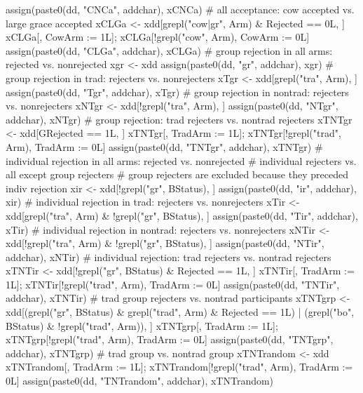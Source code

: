 \begin{Schunk}
\begin{Sinput}
{{    assign(paste0(dd, "CNCa", addchar), xCNCa)
    # all acceptance: cow accepted vs. large grace accepted
    xCLGa <- xdd[grepl("cow|gr", Arm) & Rejected == 0L, ]
    xCLGa[, CowArm := 1L]; xCLGa[!grepl("cow", Arm), CowArm := 0L]
    assign(paste0(dd, "CLGa", addchar), xCLGa)
    # group rejection in all arms: rejected vs. nonrejected
    xgr <- xdd
    assign(paste0(dd, "gr", addchar), xgr)
    # group rejection in trad: rejecters vs. nonrejecters
    xTgr <- xdd[grepl("tra", Arm), ]
    assign(paste0(dd, "Tgr", addchar), xTgr)
    # group rejection in nontrad: rejecters vs. nonrejecters
    xNTgr <- xdd[!grepl("tra", Arm), ]
    assign(paste0(dd, "NTgr", addchar), xNTgr)
    # group rejection: trad rejecters vs. nontrad rejecters
    xTNTgr <- xdd[GRejected == 1L, ]
    xTNTgr[, TradArm := 1L]; xTNTgr[!grepl("trad", Arm), TradArm := 0L]
    assign(paste0(dd, "TNTgr", addchar), xTNTgr)
    # individual rejection in all arms: rejected vs. nonrejected
    # individual rejecters vs. all except group rejecters
    # group rejecters are excluded because they preceded indiv rejection
    xir <- xdd[!grepl("gr", BStatus), ]
    assign(paste0(dd, "ir", addchar), xir)
    # individual rejection in trad: rejecters vs. nonrejecters
    xTir <- xdd[grepl("tra", Arm) & !grepl("gr", BStatus), ]
    assign(paste0(dd, "Tir", addchar), xTir)
    # individual rejection in nontrad: rejecters vs. nonrejecters
    xNTir <- xdd[!grepl("tra", Arm) & !grepl("gr", BStatus), ]
    assign(paste0(dd, "NTir", addchar), xNTir)
    # individual rejection: trad rejecters vs. nontrad rejecters
    xTNTir <- xdd[!grepl("gr", BStatus) & Rejected == 1L, ]
    xTNTir[, TradArm := 1L]; xTNTir[!grepl("trad", Arm), TradArm := 0L]
    assign(paste0(dd, "TNTir", addchar), xTNTir)
    # trad group rejecters vs. nontrad participants
    xTNTgrp <- xdd[(grepl("gr", BStatus) & grepl("trad", Arm) & Rejected == 1L) |
      (grepl("bo", BStatus) & !grepl("trad", Arm)), ]
    xTNTgrp[, TradArm := 1L]; xTNTgrp[!grepl("trad", Arm), TradArm := 0L]
    assign(paste0(dd, "TNTgrp", addchar), xTNTgrp)
    # trad group vs. nontrad group
    xTNTrandom <- xdd
    xTNTrandom[, TradArm := 1L]; xTNTrandom[!grepl("trad", Arm), TradArm := 0L]
    assign(paste0(dd, "TNTrandom", addchar), xTNTrandom)
  }
}
\end{Sinput}
\end{Schunk}
